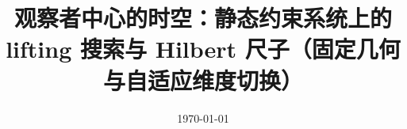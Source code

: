 \documentclass[11pt,letterpaper]{ctexart}
\title{观察者中心的时空：静态约束系统上的 lifting 搜索与 Hilbert 尺子（固定几何与自适应维度切换）}
\author{}
\date{\today}
\begin{document}
\maketitle















\FloatBarrier
\appendix


\FloatBarrier

\end{document}
